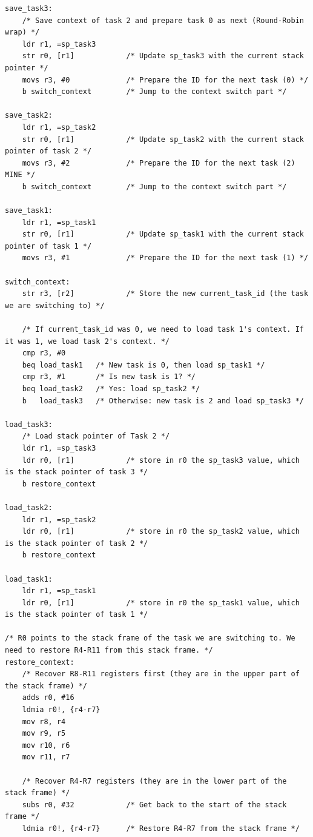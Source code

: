 \documentclass[12pt,letterpaper]{article}
\begin{document}
\begin{lstlisting}[style=modernc, caption={\texttt{pendsv.s}}]
save_task3:
    /* Save context of task 2 and prepare task 0 as next (Round-Robin wrap) */
    ldr r1, =sp_task3
    str r0, [r1]            /* Update sp_task3 with the current stack pointer */
    movs r3, #0             /* Prepare the ID for the next task (0) */
    b switch_context        /* Jump to the context switch part */
	
save_task2:
    ldr r1, =sp_task2
    str r0, [r1]            /* Update sp_task2 with the current stack pointer of task 2 */
    movs r3, #2             /* Prepare the ID for the next task (2) MINE */
    b switch_context        /* Jump to the context switch part */

save_task1:
    ldr r1, =sp_task1
    str r0, [r1]            /* Update sp_task1 with the current stack pointer of task 1 */
    movs r3, #1             /* Prepare the ID for the next task (1) */

switch_context:
    str r3, [r2]            /* Store the new current_task_id (the task we are switching to) */

    /* If current_task_id was 0, we need to load task 1's context. If it was 1, we load task 2's context. */
    cmp r3, #0
    beq load_task1   /* New task is 0, then load sp_task1 */
    cmp r3, #1       /* Is new task is 1? */
    beq load_task2   /* Yes: load sp_task2 */
    b   load_task3   /* Otherwise: new task is 2 and load sp_task3 */

load_task3:
    /* Load stack pointer of Task 2 */
    ldr r1, =sp_task3
    ldr r0, [r1]            /* store in r0 the sp_task3 value, which is the stack pointer of task 3 */
    b restore_context
	
load_task2:
    ldr r1, =sp_task2
    ldr r0, [r1]            /* store in r0 the sp_task2 value, which is the stack pointer of task 2 */
    b restore_context	

load_task1:
    ldr r1, =sp_task1
    ldr r0, [r1]            /* store in r0 the sp_task1 value, which is the stack pointer of task 1 */

/* R0 points to the stack frame of the task we are switching to. We need to restore R4-R11 from this stack frame. */
restore_context:
    /* Recover R8-R11 registers first (they are in the upper part of the stack frame) */
    adds r0, #16
    ldmia r0!, {r4-r7}
    mov r8, r4
    mov r9, r5
    mov r10, r6
    mov r11, r7
    
    /* Recover R4-R7 registers (they are in the lower part of the stack frame) */
    subs r0, #32            /* Get back to the start of the stack frame */
    ldmia r0!, {r4-r7}      /* Restore R4-R7 from the stack frame */
    

\end{lstlisting}
\end{document}
